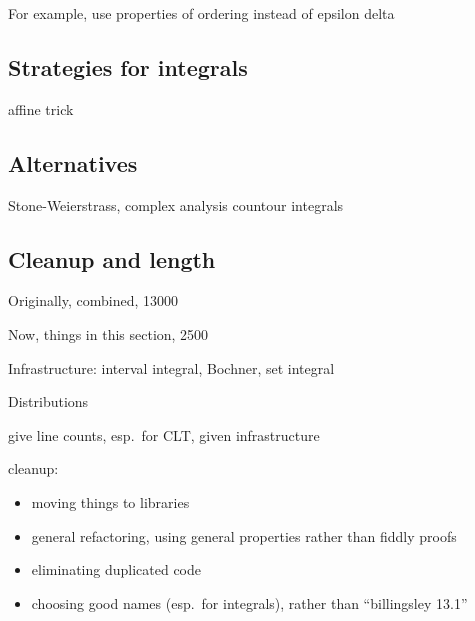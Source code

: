 \documentclass{svjour3}
\begin{document}
For example, use properties of ordering instead of epsilon delta

\subsection{Strategies for integrals}

affine trick

\subsection{Alternatives}

Stone-Weierstrass, complex analysis countour integrals

\subsection{Cleanup and length}

Originally, combined, 13000

Now, things in this section, 2500

Infrastructure: interval integral, Bochner, set integral

Distributions

give line counts, esp.~for CLT, given infrastructure


cleanup:
\begin{itemize}
 \item moving things to libraries
 \item general refactoring, using general properties rather than fiddly proofs
 \item eliminating duplicated code
 \item choosing good names (esp.~for integrals), rather than ``billingsley 13.1''
\end{itemize}



\end{document}
